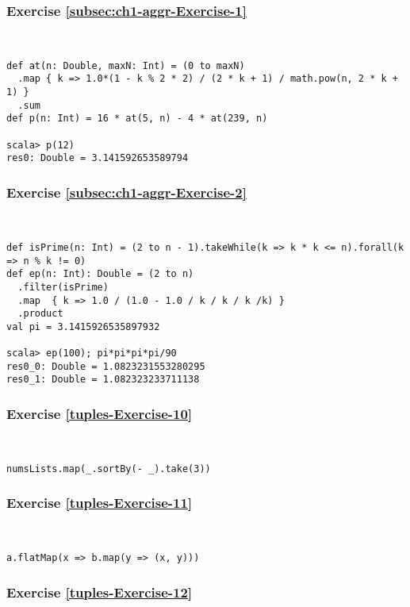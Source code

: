 \subsubsection*{Exercise \ref{subsec:ch1-aggr-Exercise-1}}

~
\begin{lstlisting}
def at(n: Double, maxN: Int) = (0 to maxN)
  .map { k => 1.0*(1 - k % 2 * 2) / (2 * k + 1) / math.pow(n, 2 * k + 1) }
  .sum
def p(n: Int) = 16 * at(5, n) - 4 * at(239, n)

scala> p(12)
res0: Double = 3.141592653589794
\end{lstlisting}


\subsubsection*{Exercise \ref{subsec:ch1-aggr-Exercise-2}}

~
\begin{lstlisting}
def isPrime(n: Int) = (2 to n - 1).takeWhile(k => k * k <= n).forall(k => n % k != 0)
def ep(n: Int): Double = (2 to n)
  .filter(isPrime)
  .map  { k => 1.0 / (1.0 - 1.0 / k / k / k /k) }
  .product
val pi = 3.1415926535897932

scala> ep(100); pi*pi*pi*pi/90
res0_0: Double = 1.0823231553280295
res0_1: Double = 1.082323233711138 
\end{lstlisting}


\subsubsection*{Exercise \ref{tuples-Exercise-10}}

~
\begin{lstlisting}
numsLists.map(_.sortBy(- _).take(3))
\end{lstlisting}


\subsubsection*{Exercise \ref{tuples-Exercise-11}}

~
\begin{lstlisting}
a.flatMap(x => b.map(y => (x, y)))
\end{lstlisting}


\subsubsection*{Exercise \ref{tuples-Exercise-12}}


